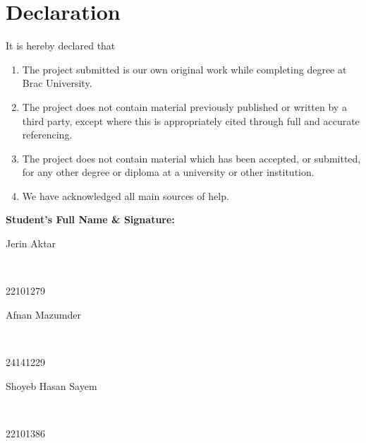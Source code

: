 \newcommand*\wildcard[2][6cm]{\vspace{2cm}\parbox{#1}{\hrulefill\par#2}}


\section*{Declaration}

It is hereby declared that

\begin{enumerate} %
  \item The project submitted is our own original work while completing degree at Brac University.
  \item The project does not contain material previously published or written by a third party, except where this is appropriately cited through full and accurate referencing.
  \item The project does not contain material which has been accepted, or submitted, for any other degree or diploma at a university or other institution.
  \item We have acknowledged all main sources of help.
\end{enumerate}

\vspace{1cm}
\textbf{Student's Full Name \& Signature:} %

\begingroup

    \begin{center} %
        \wildcard{\centerline{Jerin Aktar} ~\\ \centerline{22101279}} %
        \par
        \wildcard{\centerline{Afnan Mazumder} ~\\ \centerline{24141229}}
        \par
        \wildcard{\centerline{Shoyeb Hasan Sayem} ~\\ \centerline{22101386}}
    \end{center}

\endgroup


\pagebreak
